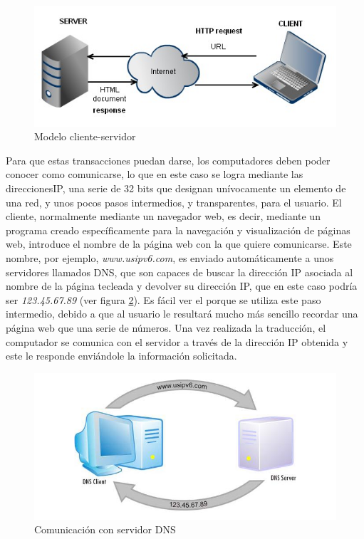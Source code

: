 \begin{figure}[hbtp]
\centering
\includegraphics[scale=0.5, fbox={\fboxrule} 4mm]{images/03-antecedentes/10-client_server.png}
\caption{Modelo cliente-servidor}
\label{fig:cliente-servidor}
\end{figure}

Para que estas transacciones puedan darse, los computadores deben poder conocer como comunicarse, lo que en este caso se logra mediante las direcciones\ac{IP}, una serie de 32 bits que designan unívocamente un elemento de una red, y unos pocos pasos intermedios, y transparentes, para el usuario. El cliente, normalmente mediante un navegador web, es decir, mediante un programa creado específicamente para la navegación y visualización de páginas web, introduce el nombre de la página web con la que quiere comunicarse. Este nombre, por ejemplo, \textit{www.usipv6.com}, es enviado automáticamente a unos servidores llamados \ac{DNS}, que son capaces de buscar la dirección \ac{IP} asociada al nombre de la página tecleada y devolver su dirección \ac{IP}, que en este caso podría ser \textit{123.45.67.89} (ver figura \ref{fig:dns-server}). Es fácil ver el porque se utiliza este paso intermedio, debido a que al usuario le resultará mucho más sencillo recordar una página web que una serie de números. Una vez realizada la traducción, el computador se comunica con el servidor a través de la dirección \ac{IP} obtenida y este le responde enviándole la información solicitada.

\begin{figure}[hbtp]
\centering
\includegraphics[scale=0.5, fbox={\fboxrule} 4mm]{images/03-antecedentes/11-dns_server.png}
\caption{Comunicación con servidor DNS}
\label{fig:dns-server}
\end{figure}


